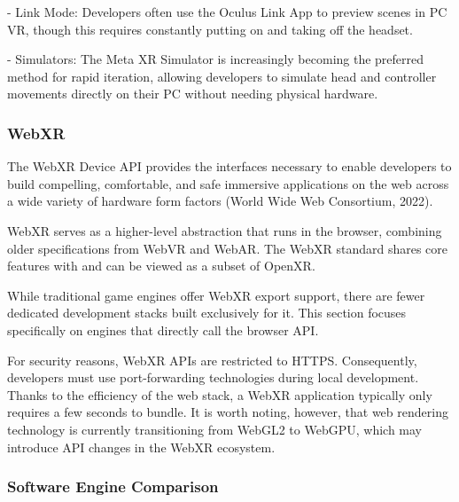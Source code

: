 - Link Mode: Developers often use the Oculus Link App to preview scenes in PC VR, though this requires constantly putting on and taking off the headset.

- Simulators: The Meta XR Simulator is increasingly becoming the preferred method for rapid iteration, allowing developers to simulate head and controller movements directly on their PC without needing physical hardware.

\subsubsection{WebXR}

The WebXR Device API provides the interfaces necessary to enable developers to build compelling, comfortable, and safe immersive applications on the web across a wide variety of hardware form factors (World Wide Web Consortium, 2022).

WebXR serves as a higher-level abstraction that runs in the browser, combining older specifications from WebVR and WebAR. The WebXR standard shares core features with and can be viewed as a subset of OpenXR.

While traditional game engines offer WebXR export support, there are fewer dedicated development stacks built exclusively for it. This section focuses specifically on engines that directly call the browser API.

For security reasons, WebXR APIs are restricted to HTTPS. Consequently, developers must use port-forwarding technologies during local development. Thanks to the efficiency of the web stack, a WebXR application typically only requires a few seconds to bundle. It is worth noting, however, that web rendering technology is currently transitioning from WebGL2 to WebGPU, which may introduce API changes in the WebXR ecosystem.


\subsubsection{Software Engine Comparison}

